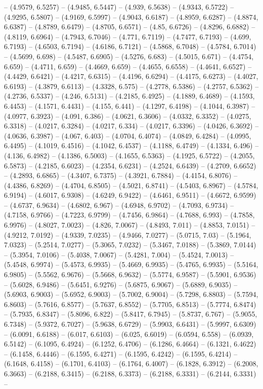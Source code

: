 -- (4.9579, 6.5257) -- (4.9485, 6.5447) -- (4.939, 6.5638) -- (4.9343, 6.5722) -- (4.9295, 6.5807) -- (4.9169, 6.5997) -- (4.9043, 6.6187) -- (4.8959, 6.6287) -- (4.8874, 6.6387) -- (4.8789, 6.6479) -- (4.8705, 6.6571) -- (4.85, 6.6726) -- (4.8296, 6.6882) -- (4.8119, 6.6964) -- (4.7943, 6.7046) -- (4.771, 6.7119) -- (4.7477, 6.7193) -- (4.699, 6.7193) -- (4.6503, 6.7194) -- (4.6186, 6.7121) -- (4.5868, 6.7048) -- (4.5784, 6.7014) -- (4.5699, 6.698) -- (4.5487, 6.6905) -- (4.5276, 6.683) -- (4.5015, 6.671) -- (4.4754, 6.659) -- (4.4711, 6.659) -- (4.4669, 6.659) -- (4.4655, 6.6558) -- (4.4641, 6.6527) -- (4.4429, 6.6421) -- (4.4217, 6.6315) -- (4.4196, 6.6294) -- (4.4175, 6.6273) -- (4.4027, 6.6193) -- (4.3879, 6.6113) -- (4.3328, 6.575) -- (4.2778, 6.5386) -- (4.2757, 6.5362) -- (4.2736, 6.5337) -- (4.246, 6.5131) -- (4.2185, 6.4925) -- (4.1889, 6.4689) -- (4.1593, 6.4453) -- (4.1571, 6.4431) -- (4.155, 6.441) -- (4.1297, 6.4198) -- (4.1044, 6.3987) -- (4.0977, 6.3923) -- (4.091, 6.386) -- (4.0621, 6.3606) -- (4.0332, 6.3352) -- (4.0275, 6.3318) -- (4.0217, 6.3284) -- (4.0217, 6.334) -- (4.0217, 6.3396) -- (4.0426, 6.3692) -- (4.0636, 6.3987) -- (4.067, 6.403) -- (4.0704, 6.4074) -- (4.0849, 6.4284) -- (4.0995, 6.4495) -- (4.1019, 6.4516) -- (4.1042, 6.4537) -- (4.1188, 6.4749) -- (4.1334, 6.496) -- (4.136, 6.4982) -- (4.1386, 6.5003) -- (4.1655, 6.5363) -- (4.1925, 6.5722) -- (4.2055, 6.5873) -- (4.2185, 6.6023) -- (4.2354, 6.6231) -- (4.2524, 6.6439) -- (4.2709, 6.6652) -- (4.2893, 6.6865) -- (4.3407, 6.7375) -- (4.3921, 6.7884) -- (4.4154, 6.8076) -- (4.4386, 6.8269) -- (4.4704, 6.8505) -- (4.5021, 6.8741) -- (4.5403, 6.8967) -- (4.5784, 6.9194) -- (4.6017, 6.9308) -- (4.6249, 6.9422) -- (4.6461, 6.9511) -- (4.6672, 6.9599) -- (4.6737, 6.9634) -- (4.6802, 6.967) -- (4.6948, 6.9702) -- (4.7093, 6.9734) -- (4.7158, 6.9766) -- (4.7223, 6.9799) -- (4.7456, 6.9864) -- (4.7688, 6.993) -- (4.7858, 6.9976) -- (4.8027, 7.0023) -- (4.826, 7.0067) -- (4.8493, 7.011) -- (4.8853, 7.0151) -- (4.9212, 7.0192) -- (4.9339, 7.0235) -- (4.9466, 7.0277) -- (5.0715, 7.03) -- (5.1964, 7.0323) -- (5.2514, 7.0277) -- (5.3065, 7.0232) -- (5.3467, 7.0188) -- (5.3869, 7.0144) -- (5.3954, 7.0106) -- (5.4038, 7.0067) -- (5.4281, 7.004) -- (5.4524, 7.0013) -- (5.4548, 6.9974) -- (5.4573, 6.9935) -- (5.4669, 6.9935) -- (5.4765, 6.9935) -- (5.5164, 6.9805) -- (5.5562, 6.9676) -- (5.5668, 6.9632) -- (5.5774, 6.9587) -- (5.5901, 6.9536) -- (5.6028, 6.9486) -- (5.6451, 6.9276) -- (5.6875, 6.9067) -- (5.6889, 6.9035) -- (5.6903, 6.9003) -- (5.6952, 6.9003) -- (5.7002, 6.9004) -- (5.7298, 6.8803) -- (5.7594, 6.8603) -- (5.7616, 6.8577) -- (5.7637, 6.8552) -- (5.7705, 6.8513) -- (5.7774, 6.8474) -- (5.7935, 6.8347) -- (5.8096, 6.822) -- (5.8417, 6.7945) -- (5.8737, 6.767) -- (5.9055, 6.7348) -- (5.9372, 6.7027) -- (5.9638, 6.6729) -- (5.9903, 6.6431) -- (5.9997, 6.6309) -- (6.0091, 6.6188) -- (6.017, 6.6103) -- (6.025, 6.6019) -- (6.0594, 6.558) -- (6.0939, 6.5142) -- (6.1095, 6.4924) -- (6.1252, 6.4706) -- (6.1286, 6.4664) -- (6.1321, 6.4622) -- (6.1458, 6.4446) -- (6.1595, 6.4271) -- (6.1595, 6.4242) -- (6.1595, 6.4214) -- (6.1648, 6.4158) -- (6.1701, 6.4103) -- (6.1764, 6.4007) -- (6.1828, 6.3912) -- (6.2008, 6.3663) -- (6.2188, 6.3415) -- (6.2188, 6.3373) -- (6.2188, 6.3331) -- (6.2144, 6.3331) -- 